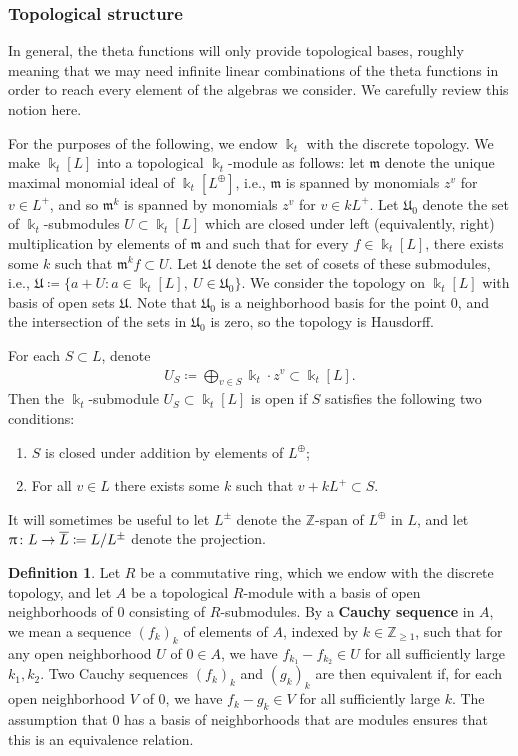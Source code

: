 \documentclass{amsart}
\let\?=\overline
\let\bb=\mathbb
\let\rar=\rightarrow
\let\f=\mathfrak
\newcommand {\kk} {\Bbbk}
\newcommand {\kt} {\kk_t}
\renewcommand{\pi}{\uppi\hspace{0.05em}}
\theoremstyle{plain}%
\theoremstyle{definition}
\newtheorem{dfn}[thm]{Definition}
\theoremstyle{remark}
\begin{document}
\subsubsection{Topological structure}\label{TopStr}

In general, the theta functions will only provide topological bases, roughly meaning that we may need infinite linear combinations of the theta functions in order to reach every element of the algebras we consider.  We carefully review this notion here.


For the purposes of the following, we endow $\kk_t$ with the discrete topology.  We make $\kk_t[L]$ into a topological $\kk_t$-module as follows: let $\f{m}$ denote the unique maximal monomial ideal of $\kk_t[L^{\oplus}]$, i.e., $\f{m}$ is spanned by monomials $z^v$ for $v\in L^+$, and so $\f{m}^k$ is spanned by monomials $z^v$ for $v\in kL^+$.  Let $\f{U}_0$ denote the set of $\kk_t$-submodules $U\subset \kk_t[L]$ which are closed under left (equivalently, right) multiplication by elements of $\f{m}$ and such that for every $f\in \kk_t[L]$, there exists some $k$ such that $\f{m}^kf\subset U$.  Let $\f{U}$ denote the set of cosets of these submodules, i.e., $\f{U}\coloneqq \{a+U\colon a\in \kk_t[L],\medspace U\in \f{U}_0\}$.  We consider the topology on $\kk_t[L]$ with basis of open sets $\f{U}$.  Note that $\f{U}_0$ is a neighborhood basis for the point $0$, and the intersection of the sets in $\f{U}_0$ is zero, so the topology is Hausdorff.
 
For each $S\subset L$, denote
\begin{align*}
    U_S\coloneqq \bigoplus_{v\in S} \kt\cdot z^v\subset \kk_t[L].
\end{align*}
Then the $\kk_t$-submodule $U_S\subset \kk_t[L]$ is open if $S$ satisfies the following two conditions:
\begin{enumerate}
    \item $S$ is closed under addition by elements of $L^{\oplus}$;
    \item
    For all $v\in L$ there exists some $k$ such that $v+kL^+\subset S$.
\end{enumerate}
It will sometimes be useful to let $L^{\pm}$ denote the $\bb{Z}$-span of $L^{\oplus}$ in $L$, and let $\pi\colon L\rar\?{L}\coloneqq L/L^{\pm}$ denote the projection.



\begin{dfn}\label{CauchyDef}
Let $R$ be a commutative ring, which we endow with the discrete topology, and let $A$ be a topological $R$-module with a basis of open neighborhoods of $0$ consisting of $R$-submodules.  By a \textbf{Cauchy sequence} in $A$, we mean a sequence $(f_k)_k$ of elements of $A$, indexed by $k\in\bb{Z}_{\geq 1}$, such that for any open neighborhood $U$ of $0\in A$, we have $f_{k_1}-f_{k_2}\in U$ for all sufficiently large $k_1,k_2$.  Two Cauchy sequences $(f_k)_k$ and $(g_k)_k$ are then equivalent if, for each open neighborhood $V$ of $0$, we have $f_k-g_k\in V$ for all sufficiently large $k$.  The assumption that $0$ has a basis of neighborhoods that are modules ensures that this is an equivalence relation. 
\end{dfn}
\end{document}
